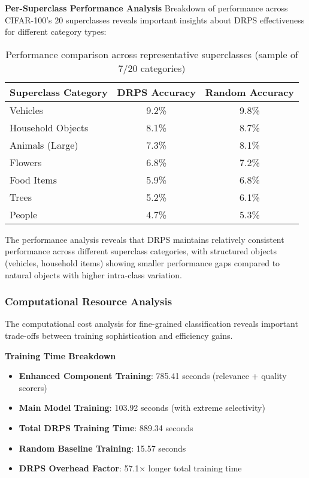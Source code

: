 \documentclass[12pt]{article}
\begin{document}
\textbf{Per-Superclass Performance Analysis}
Breakdown of performance across CIFAR-100's 20 superclasses reveals important insights about DRPS effectiveness for different category types:

\begin{table}[h]
\centering
\begin{tabular}{lcc}
\toprule
\textbf{Superclass Category} & \textbf{DRPS Accuracy} & \textbf{Random Accuracy} \\
\midrule
Vehicles & 9.2\% & 9.8\% \\
Household Objects & 8.1\% & 8.7\% \\
Animals (Large) & 7.3\% & 8.1\% \\
Flowers & 6.8\% & 7.2\% \\
Food Items & 5.9\% & 6.8\% \\
Trees & 5.2\% & 6.1\% \\
People & 4.7\% & 5.3\% \\
\bottomrule
\end{tabular}
\caption{Performance comparison across representative superclasses (sample of 7/20 categories)}
\end{table}

The performance analysis reveals that DRPS maintains relatively consistent performance across different superclass categories, with structured objects (vehicles, household items) showing smaller performance gaps compared to natural objects with higher intra-class variation.

\subsubsection{Computational Resource Analysis}\label{resource-analysis}

The computational cost analysis for fine-grained classification reveals important trade-offs between training sophistication and efficiency gains.

\textbf{Training Time Breakdown}
\begin{itemize}
\item \textbf{Enhanced Component Training}: 785.41 seconds (relevance + quality scorers)
\item \textbf{Main Model Training}: 103.92 seconds (with extreme selectivity)
\item \textbf{Total DRPS Training Time}: 889.34 seconds
\item \textbf{Random Baseline Training}: 15.57 seconds
\item \textbf{DRPS Overhead Factor}: 57.1× longer total training time
\end{itemize}
\end{document}
